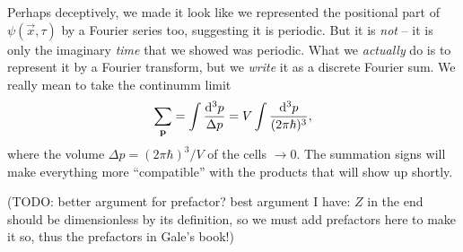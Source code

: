 Perhaps deceptively, we made it look like we represented the positional part of $\psi(\vec{x}, \tau)$ by a Fourier series too, suggesting it is periodic.
But it is \emph{not} -- it is only the imaginary \emph{time} that we showed was periodic.
What we \emph{actually} do is to represent it by a Fourier transform, but we \emph{write} it as a discrete Fourier sum.
We really mean to take the continumm limit
\begin{equation}
	\sum_{\mathbf{p}} = \int \frac{\mathop{}\!\mathrm{d}^3 p}{\Delta p} = V \int \frac{\mathop{}\!\mathrm{d}^3 p}{(2 \pi \hbar)^3} ,
\end{equation}
where the volume $\Delta p = (2 \pi \hbar)^3 / V$ of the cells $\rightarrow 0$.
The summation signs will make everything more ``compatible'' with the products that will show up shortly.

(TODO: better argument for prefactor? best argument I have: $Z$ in the end should be dimensionless by its definition, so we must add prefactors here to make it so, thus the prefactors in Gale's book!)

